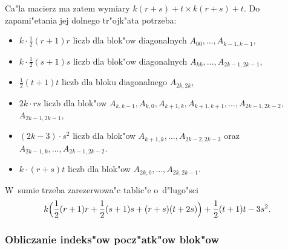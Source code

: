 Ca"la macierz ma zatem wymiary $k(r+s)+t\times k(r+s)+t$. Do zapami"etania
jej dolnego tr"ojk"ata potrzeba:
\begin{itemize}
  \item $k\cdot\frac{1}{2}(r+1)r$ liczb dla blok"ow diagonalnych
    $A_{00},\ldots,A_{k-1,k-1}$,
  \item $k\cdot\frac{1}{2}(s+1)s$ liczb dla blok"ow diagonalnych
    $A_{kk},\ldots,A_{2k-1,2k-1}$,
  \item $\frac{1}{2}(t+1)t$ liczb dla bloku diagonalnego $A_{2k,2k}$,
  \item \raggedright
    $2k\cdot rs$ liczb dla blok"ow $A_{k,k-1},A_{k,0},A_{k+1,k},A_{k+1,k+1},%
    \ldots,\allowbreak A_{2k-1,2k-2},$ \\ $A_{2k-1,2k-1}$,
  \item $(2k-3)\cdot s^2$ liczb dla blok"ow $A_{k+1,k},\ldots,A_{2k-2,2k-3}$
    oraz $A_{2k-1,k},\ldots,A_{2k-1,2k-2}$.
  \item $k\cdot(r+s)t$ liczb dla blok"ow $A_{2k,0},\ldots,A_{2k,2k-1}$.
\end{itemize}
W~sumie trzeba zarezerwowa"c tablic"e o~d"lugo"sci
\begin{align*}
k\Bigl(\frac{1}{2}(r+1)r+\frac{1}{2}(s+1)s+(r+s)(t+2s)\Bigr)+\frac{1}{2}(t+1)t-3s^2.
\end{align*}


\subsubsection*{Obliczanie indeks"ow pocz"atk"ow blok"ow}

